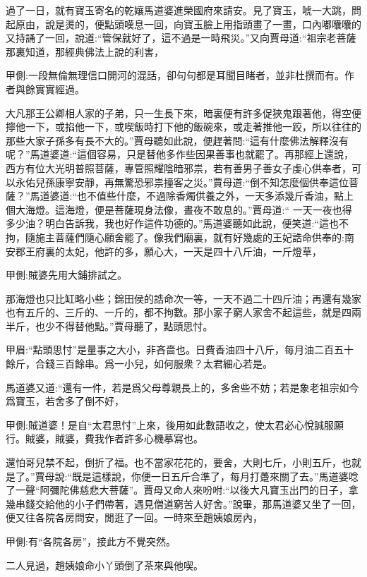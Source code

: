 \begin{parag}
    過了一日，就有寶玉寄名的乾孃馬道婆進榮國府來請安。見了寶玉，唬一大跳，問起原由，說是燙的，便點頭嘆息一回，向寶玉臉上用指頭畫了一畫，口內嘟囔囔的又持誦了一回，說道:“管保就好了，這不過是一時飛災。”又向賈母道:“祖宗老菩薩那裏知道，那經典佛法上說的利害，\begin{note}甲側:一段無倫無理信口開河的混話，卻句句都是耳聞目睹者，並非杜撰而有。作者與餘實實經過。\end{note}大凡那王公卿相人家的子弟，只一生長下來，暗裏便有許多促狹鬼跟著他，得空便擰他一下，或掐他一下，或喫飯時打下他的飯碗來，或走著推他一跤，所以往往的那些大家子孫多有長不大的。”賈母聽如此說，便趕著問:“這有什麼佛法解釋沒有呢？”馬道婆道:“這個容易，只是替他多作些因果善事也就罷了。再那經上還說，西方有位大光明普照菩薩，專管照耀陰暗邪祟，若有善男子善女子虔心供奉者，可以永佑兒孫康寧安靜，再無驚恐邪祟撞客之災。”賈母道:“倒不知怎麼個供奉這位菩薩？”馬道婆道:“也不值些什麼，不過除香燭供養之外，一天多添幾斤香油，點上個大海燈。這海燈，便是菩薩現身法像，晝夜不敢息的。”賈母道:“ 一天一夜也得多少油？明白告訴我，我也好作這件功德的。”馬道婆聽如此說，便笑道:“這也不拘，隨施主菩薩們隨心願舍罷了。像我們廟裏，就有好幾處的王妃誥命供奉的:南安郡王府裏的太妃，他許的多，願心大，一天是四十八斤油，一斤燈草，\begin{note}甲側:賊婆先用大鋪排試之。\end{note}那海燈也只比缸略小些；錦田侯的誥命次一等，一天不過二十四斤油；再還有幾家也有五斤的、三斤的、一斤的，都不拘數。那小家子窮人家舍不起這些，就是四兩半斤，也少不得替他點。”賈母聽了，點頭思忖。\begin{note}甲眉:“點頭思忖”是量事之大小，非吝嗇也。日費香油四十八斤，每月油二百五十餘斤，合錢三百餘串。爲一小兒，如何服衆？太君細心若是。\end{note}馬道婆又道:“還有一件，若是爲父母尊親長上的，多舍些不妨；若是象老祖宗如今爲寶玉，若舍多了倒不好，\begin{note}甲側:賊道婆！是自“太君思忖”上來，後用如此數語收之，使太君必心悅誠服願行。賊婆，賊婆，費我作者許多心機摹寫也。\end{note}還怕哥兒禁不起，倒折了福。也不當家花花的，要舍，大則七斤，小則五斤，也就是了。”賈母說:“既是這樣說，你便一日五斤合準了，每月打躉來關了去。”馬道婆唸了一聲“阿彌陀佛慈悲大菩薩”。賈母又命人來吩咐:“以後大凡寶玉出門的日子，拿幾串錢交給他的小子們帶著，遇見僧道窮苦人好舍。”說畢，那馬道婆又坐了一回，便又往各院各房問安，閒逛了一回。一時來至趙姨娘房內，\begin{note}甲側:有“各院各房”，接此方不覺突然。\end{note}二人見過，趙姨娘命小丫頭倒了茶來與他喫。
\end{parag}


